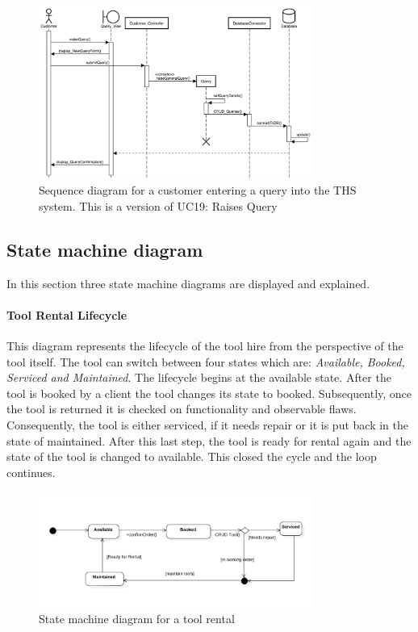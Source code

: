 \documentclass[fontsize=11pt]{extarticle}
\numberwithin{figure}{section} %
\numberwithin{table}{section}%
\let\oldparagraph\paragraph
\renewcommand{\paragraph}[1]{\oldparagraph{#1}\mbox{}}
\begin{document}
\begin{figure}[H]
      \centering
      \includegraphics[trim = 0 0 0 0, clip, width=0.8\textwidth]{TempImg/make_query_SD.png}
      \caption{Sequence diagram for a customer entering a query into the THS system. This is a version of UC19: Raises Query}
\end{figure}

\hypertarget{state-machine-diagram}{%
\subsection{State machine diagram}\label{state-machine-diagram}}

In this section three state machine diagrams are displayed and
explained.

\hypertarget{tool-rental-lifecycle}{%
\paragraph{Tool Rental Lifecycle}\label{tool-rental-lifecycle}}

This diagram represents the lifecycle of the tool hire from the
perspective of the tool itself. The tool can switch between four states
which are: \textit{Available, Booked, Serviced and Maintained}. The
lifecycle begins at the available state. After the tool is booked by a
client the tool changes its state to booked. Subsequently, once the tool
is returned it is checked on functionality and observable flaws.
Consequently, the tool is either serviced, if it needs repair or it is
put back in the state of maintained. After this last step, the tool is
ready for rental again and the state of the tool is changed to
available. This closed the cycle and the loop continues.

\begin{figure}[H]
      \centering
      \includegraphics[trim = 0 0 0 0, clip, width=0.8\textwidth]{TempImg/ToolSM.png}
      \caption{State machine diagram for a tool rental}
\end{figure}
\end{document}
